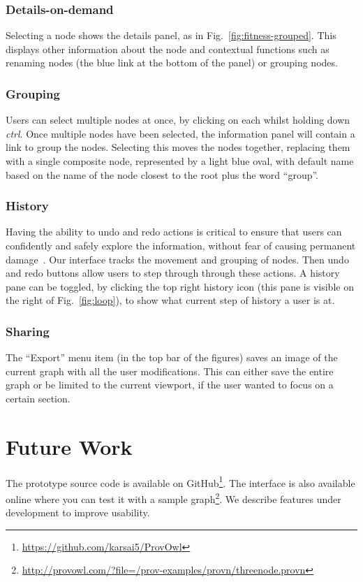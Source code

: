 \subsection{Details-on-demand}
Selecting a node shows the details panel, as in Fig.~\ref{fig:fitness-grouped}. This displays other information about the node and contextual functions such as renaming nodes (the blue link at the bottom of the panel) or grouping nodes.

\subsection{Grouping}

Users can select multiple nodes at once, by clicking on each whilst holding down \textit{ctrl}. 
Once multiple nodes have been selected, the information panel will contain a link to group the nodes. 
Selecting this moves the nodes together, replacing them with a single composite node, represented by a light blue oval, 
with default name based on the name of the node closest to the root plus the word ``group''. 

\subsection{History}

Having the ability to undo and redo 
actions is critical to ensure that users can confidently and safely explore the information, 
without fear of causing permanent damage~\cite{Shneiderman1996}. 
Our interface tracks the movement and grouping of nodes. 
Then undo and redo buttons allow users to step through through these actions. 
A history pane can be toggled, by clicking the top right history icon (this pane is visible on the right of Fig.~\ref{fig:loop}), to show what current step of history a user is at.

\subsection{Sharing}

The ``Export'' menu item (in the top bar of the figures)
saves an image of the current graph with all the user modifications. 
This can either save the entire graph or be limited to the current viewport,
if the user wanted to focus on a certain section.

\chapter{Future Work}
The prototype source code is available on GitHub\footnote{\url{https://github.com/karsai5/ProvOwl}}. The interface is also available online where you can test it with a sample graph\footnote{\url{http://provowl.com/?file=/prov-examples/provn/threenode.provn}}.
We describe features under development to improve usability.

